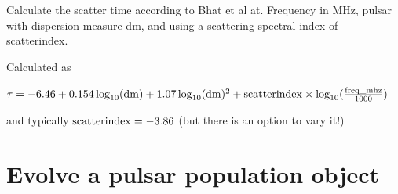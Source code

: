 \documentclass[letterpaper,10pt,english]{sphinxmanual}
\begin{document}
\begin{fulllineitems}
\label{\detokenize{module-level-docs:galacticops.scatter_bhat}}
\pysigstartsignatures
\pysiglinewithargsret
{}
{\sphinxparamcomma {}\sphinxparamcomma {}}
{}
\pysigstopsignatures
\sphinxAtStartPar
Calculate the scatter time according to Bhat et al at. Frequency in MHz, pulsar with dispersion measure dm, and using a scattering spectral index of scatterindex.

\sphinxAtStartPar
Calculated as

\sphinxAtStartPar
\(\tau = -6.46 + 0.154 \log_{10}({\rm{dm}}) + 1.07\log_{10}({\rm{dm}})^2 + {\rm{scatterindex}} \times \log_{10}(\frac{\rm{freq\_mhz}}{1000})\)

\sphinxAtStartPar
and typically \({\rm{scatterindex}} = -3.86\) (but there is an option to vary it!)

\end{fulllineitems}



\section{{\hyperref[\detokenize{module-level-docs:module-evolve}]{}} \textendash{} Evolve a pulsar population object}
\label{\detokenize{module-level-docs:evolve-evolve-a-pulsar-population-object}}\label{\detokenize{module-level-docs:evolve-module-docs}}\label{\detokenize{module-level-docs:module-evolve}}

\begin{fulllineitems}
\label{\detokenize{module-level-docs:evolve.EvolveException}}
\pysigstartsignatures
\pysigline
{}
\pysigstopsignatures
\end{fulllineitems}

\end{document}
